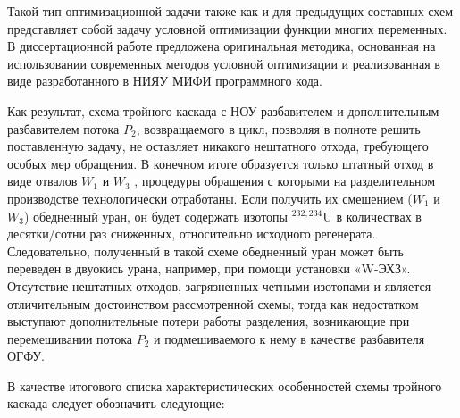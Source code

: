 Такой тип оптимизационной задачи также как и для предыдущих составных схем представляет собой задачу условной оптимизации функции многих переменных. В диссертационной работе предложена оригинальная методика, основанная на использовании современных методов условной оптимизации и реализованная в виде разработанного в НИЯУ МИФИ программного кода.



Как результат, схема тройного каскада с НОУ-разбавителем и дополнительным разбавителем потока $P_2$, возвращаемого в цикл, позволяя в полноте решить поставленную задачу, не оставляет никакого нештатного отхода, требующего особых мер обращения. В конечном итоге образуется только штатный отход в виде отвалов $W_1$ и $W_3$ , процедуры обращения с которыми на разделительном производстве технологически отработаны. Если получить их смешением ($W_1$ и $W_3$) обедненный уран, он будет содержать изотопы $^{232,234}$U в количествах в десятки/сотни раз сниженных, относительно исходного регенерата. Следовательно, полученный в такой схеме обедненный уран может быть переведен в двуокись урана, например, при помощи установки «W-ЭХЗ». Отсутствие нештатных отходов, загрязненных четными изотопами и является отличительным достоинством рассмотренной схемы, тогда как недостатком выступают дополнительные потери работы разделения, возникающие при перемешивании потока $P_2$ и подмешиваемого к нему в качестве разбавителя ОГФУ. 

В качестве итогового списка характеристических особенностей схемы тройного каскада следует обозначить следующие:

